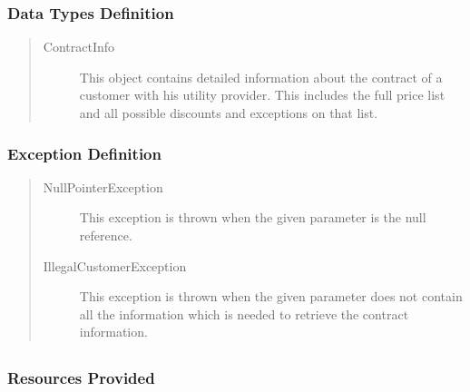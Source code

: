 \subsubsection{Data Types Definition}

\begin{quote}
	\begin{description}
		\item[ContractInfo] This object contains detailed information about the
		contract of a customer with his utility provider. This includes the full price
		list and all possible discounts and exceptions on that list.
	\end{description} 
\end{quote}

\subsubsection{Exception Definition} 

\begin{quote}
	\begin{description}
		\item[NullPointerException] This exception is thrown when the given parameter
		is the null reference.
		\item[IllegalCustomerException] This exception is thrown when the given
		parameter does not contain all the information which is needed to retrieve the
		contract information.
	\end{description} 
\end{quote}

\subsection{}

\subsubsection{Resources Provided}

